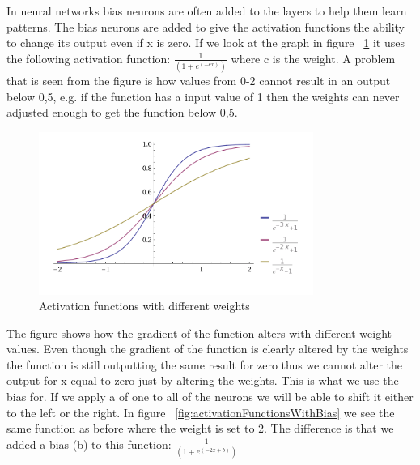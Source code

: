 In neural networks bias neurons are often added to the layers to help them learn patterns. The bias neurons are added to give the activation functions the ability to change its output even if x is zero. If we look at the graph in figure ~\ref{fig:activationFunctions} it uses the following activation function: \begin{math} \frac{1}{(1+e^{(-cx)})} \end{math} where c is the weight. A problem that is seen from the figure is how values from 0-2 cannot result in an output below 0,5, e.g. if the function has a input value of 1 then the weights can never adjusted enough to get the function below 0,5.

\begin{figure}[!ht]
\centering
\includegraphics[width=0.8\textwidth ,natwidth=410,natheight=237]{billeder/ActivationFunctions.png}
\caption{Activation functions with different weights}
\label{fig:activationFunctions}
\end{figure}

The figure shows how the gradient of the function alters with different weight values. Even though the gradient of the function is clearly altered by the weights the function is still outputting the same result for zero thus we cannot alter the output for x equal to zero just by altering the weights. This is what we use the bias for. If we apply a  of one to all of the neurons we will be able to shift it either to the left or the right. In figure ~\ref{fig:activationFunctionsWithBias} we see the same function as before where the weight is set to 2. The difference is that we added a bias (b) to this function: \begin{math} \frac{1}{(1+e^{(-2x+b)})} \end{math} \cite[p. 165]{rojas1996neural}


